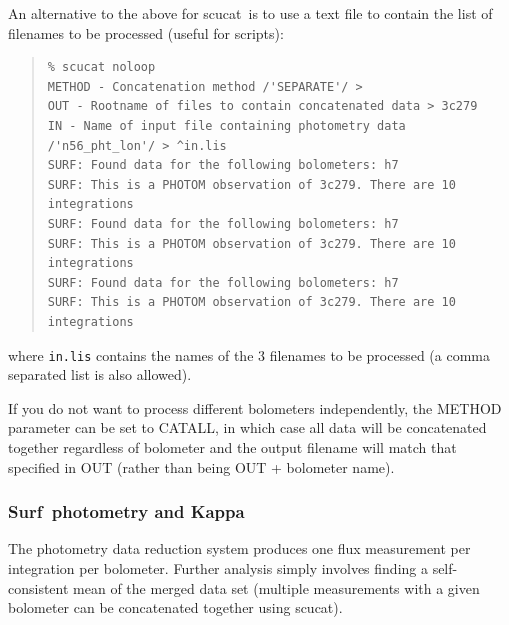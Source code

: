 \documentclass[twoside,11pt]{article}
\newcommand{\scusoft}          {{\sc Surf}}
\newcommand{\task}[1]{{\sf #1}}
\newcommand{\scucat}{\htmlref{\task{scucat}}{SCUCAT}}
\newenvironment{myquote}{\begin{quote}\begin{small}}{\end{small}\end{quote}}
\newcommand{\htmlref}[2]{#1}
\newcommand{\xref}[3]{#1}
\renewcommand{\_}{\texttt{\symbol{95}}}
\begin{document}
An alternative to the above for \scucat\ is to use a text file to contain
the list of filenames to be processed (useful for scripts):
\begin{myquote}
\begin{verbatim}
% scucat noloop
METHOD - Concatenation method /'SEPARATE'/ > 
OUT - Rootname of files to contain concatenated data > 3c279
IN - Name of input file containing photometry data /'n56_pht_lon'/ > ^in.lis
SURF: Found data for the following bolometers: h7
SURF: This is a PHOTOM observation of 3c279. There are 10 integrations
SURF: Found data for the following bolometers: h7
SURF: This is a PHOTOM observation of 3c279. There are 10 integrations
SURF: Found data for the following bolometers: h7
SURF: This is a PHOTOM observation of 3c279. There are 10 integrations
\end{verbatim}
\end{myquote}
where \texttt{in.lis} contains the names of the 3 filenames to be
processed (a comma separated list is also allowed).

If you do not want to process different bolometers independently, the
METHOD parameter can be set to CATALL, in which case all data will
be concatenated together regardless of bolometer and the output filename
will match that specified in OUT (rather than being OUT + bolometer name).


\subsubsection{\scusoft\ photometry and \xref{{\sc Kappa}}{sun95}{}}

The photometry data reduction system produces one flux measurement per
integration per bolometer. Further analysis simply involves finding a
self-consistent mean of the merged data set (multiple measurements with a
given bolometer can be concatenated together using \scucat).
\end{document}
